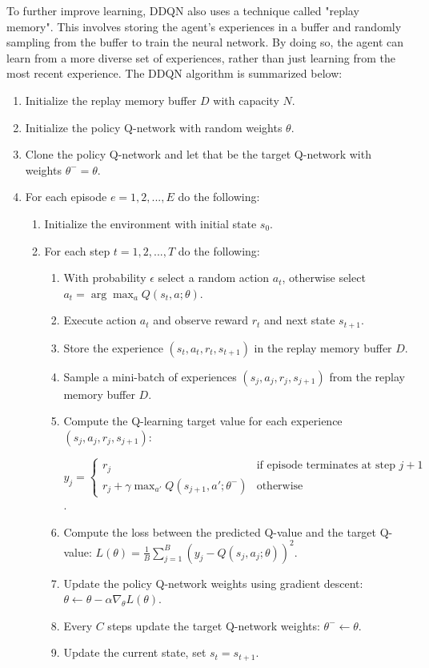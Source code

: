\documentclass[12pt,oneside]{article}
\begin{document}
To further improve learning, DDQN also uses a technique called "replay memory". This involves storing the agent's experiences in a buffer and randomly sampling from the buffer to train the neural network. By doing so, the agent can learn from a more diverse set of experiences, rather than just learning from the most recent experience. 
The DDQN algorithm is summarized below:
\begin{enumerate}
\item  \label{itm:dqn_1} Initialize the replay memory buffer $D$ with capacity $N$.
\item Initialize the policy Q-network with random weights $\theta$.
\item Clone the policy Q-network and let that be the target Q-network with weights $\theta^{-} = \theta$.
\item For each episode $e=1,2,...,E$ do the following:
	\begin{enumerate}
	\item Initialize the environment with initial state $s_0$.
	\item For each step $t=1,2,...,T$ do the following:
		\begin{enumerate}
		\item With probability $\epsilon$ select a random action $a_t$, otherwise select $a_t=\arg\max_{a} Q(s_t, a; \theta)$.
		\item Execute action $a_t$ and observe reward $r_t$ and next state $s_{t+1}$.
		\item Store the experience $(s_t, a_t, r_t, s_{t+1})$ in the replay memory buffer $D$.
		\item Sample a mini-batch of experiences $(s_j, a_j, r_j, s_{j+1})$ from the replay memory buffer $D$.
		
		\item Compute the Q-learning target value for each experience $(s_j, a_j, r_j, s_{j+1})$:
		
		 $y_j = 
		 \begin{cases} 
		 r_j & \text{if episode terminates at step } j+1 \\ 
		 r_j + \gamma\max_{a'}Q(s_{j+1},a';\theta^{-}) & \text{otherwise} \end{cases}$.
		
		\item Compute the loss between the predicted Q-value and the target Q-value: $L(\theta) = \frac{1}{B}\sum_{j=1}^B(y_j-Q(s_j,a_j;\theta))^2$.
		\item Update the policy Q-network weights using gradient descent: $\theta \leftarrow \theta - \alpha\nabla_\theta L(\theta)$.
		\item Every $C$ steps update the target Q-network weights: $\theta^{-} \leftarrow \theta$.
		\item Update the current state, set $s_t=s_{t+1}$.
		\end{enumerate}
	\end{enumerate}
\end{enumerate}
\end{document}
